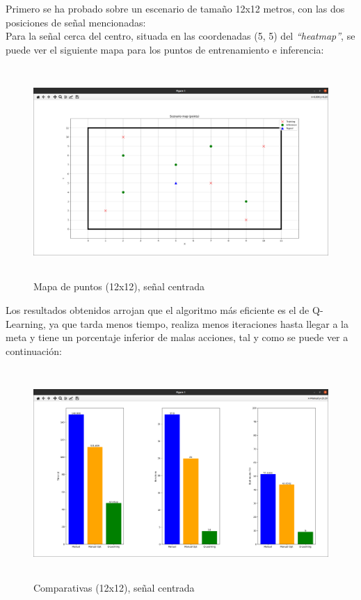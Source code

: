 Primero se ha probado sobre un escenario de tamaño 12x12 metros, con las dos posiciones de señal mencionadas:\\

Para la señal cerca del centro, situada en las coordenadas (5, 5) del \emph{``heatmap''}, se puede ver el siguiente mapa para los puntos de entrenamiento e inferencia:\\

\begin{figure} [H]
    \begin{center}
    \includegraphics[height=8cm]{imagenes/cap4/17_mapa_p_centro_12.png}
    \end{center}
    \caption[Mapa de puntos (12x12), señal centrada]{Mapa de puntos (12x12), señal centrada}
    \label{fig:map_p_center_12}
\end{figure}

Los resultados obtenidos arrojan que el algoritmo más eficiente es el de Q-Learning, ya que tarda menos tiempo, realiza menos iteraciones hasta llegar a la meta y tiene un porcentaje inferior de malas acciones, tal y como se puede ver a continuación:\\

\begin{figure} [H]
    \begin{center}
    \includegraphics[height=8cm]{imagenes/cap4/18_comp_centro_12.png}
    \end{center}
    \caption[Comparativas (12x12), señal centrada]{Comparativas (12x12), señal centrada}
    \label{fig:comp_center_12}
\end{figure}

